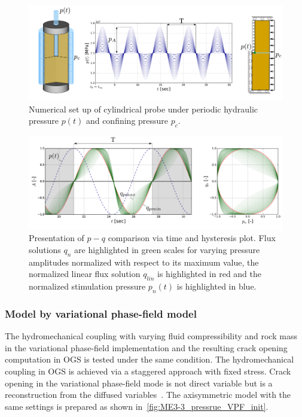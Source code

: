 \begin{figure}
\centering
\includegraphics[width=1\linewidth]{figures/ME9_experimental_set_up_nl_pq.pdf}
\caption{Numerical set up of cylindrical probe under periodic hydraulic pressure $p(t)$ and
confining pressure $p_c$.}
\label{fig:ME9_validation_set_up1}
\end{figure}
\begin{figure}
\centering
\includegraphics[width=1\linewidth]{figures/ME9_non_linear_p_q.pdf}
\caption{Presentation of $p-q$ comparison via time and hysteresis plot. Flux solutions $q_n$ are
highlighted in green scales for varying pressure amplitudes normalized with respect to its maximum value, the normalized linear flux solution $q_{lin}$ is highlighted in red and the normalized stimulation pressure $p_n(t)$ is highlighted in blue.}
\label{fig:ME9_validation_compressibility1}
\end{figure}

\subsubsection*{Model by variational phase-field model}
The hydromechanical coupling with varying fluid compressibility and rock mass in the variational phase-field implementation and the resulting crack opening computation in OGS is tested under the same condition.
The hydromechanical coupling in OGS is achieved via a staggered approach with fixed stress.  
Crack opening in the variational phase-field mode is not direct variable but is a reconstruction from the diffused variables~\cite{Yoshioka2020}.
The axisymmetric model with the same settings is prepared as shown in~\ref{fig:ME3-3_pressrue_VPF_init}.

